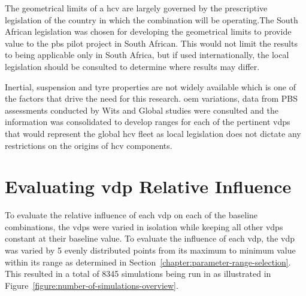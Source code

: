 The geometrical limits of a \gls{hcv} are largely governed by the prescriptive legislation of the country in which the combination will be operating.The South African legislation was chosen for developing the geometrical limits to provide value to the \gls{pbs} pilot project in South African. This would not limit the results to being applicable only in South Africa, but if used internationally, the local legislation should be consulted to determine where results may differ.

Inertial, suspension and tyre properties are not widely available which is one of the factors that drive the need for this research. \gls{oem} variations, data from PBS assessments conducted by Wits and Global studies were consulted and the information was consolidated to develop ranges for each of the pertinent \glspl{vdp} that would represent the global \gls{hcv} fleet as local legislation does not dictate any restrictions on the origins of \gls{hcv} components.

\section{Evaluating \gls{vdp} Relative Influence}

To evaluate the relative influence of each \gls{vdp} on each of the baseline combinations, the \glspl{vdp} were varied in isolation while keeping all other \glspl{vdp} constant at their baseline value. To evaluate the influence of each \gls{vdp}, the \gls{vdp} was varied by 5 evenly distributed points from its maximum to minimum value within its range as determined in Section~\ref{chapter:parameter-range-selection}. This resulted in a total of 8345 simulations being run in \trucksim{} as illustrated in Figure~\ref{figure:number-of-simulations-overview}.

